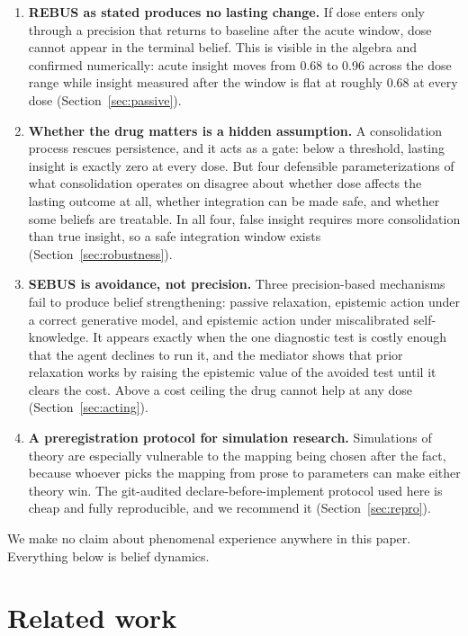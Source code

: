 \documentclass[11pt]{article}
\begin{document}
\begin{enumerate}
  \item \textbf{REBUS as stated produces no lasting change.} If dose enters only
  through a precision that returns to baseline after the acute window, dose cannot
  appear in the terminal belief. This is visible in the algebra and confirmed
  numerically: acute insight moves from 0.68 to 0.96 across the dose range while
  insight measured after the window is flat at roughly 0.68 at every dose
  (Section~\ref{sec:passive}).

  \item \textbf{Whether the drug matters is a hidden assumption.} A consolidation
  process rescues persistence, and it acts as a gate: below a threshold, lasting
  insight is exactly zero at every dose. But four defensible parameterizations of what
  consolidation operates on disagree about whether dose affects the lasting outcome at
  all, whether integration can be made safe, and whether some beliefs are treatable.
  In all four, false insight requires more consolidation than true insight, so a safe
  integration window exists (Section~\ref{sec:robustness}).

  \item \textbf{SEBUS is avoidance, not precision.} Three precision-based mechanisms
  fail to produce belief strengthening: passive relaxation, epistemic action under a
  correct generative model, and epistemic action under miscalibrated self-knowledge.
  It appears exactly when the one diagnostic test is costly enough that the agent
  declines to run it, and the mediator shows that prior relaxation works by raising
  the epistemic value of the avoided test until it clears the cost. Above a cost
  ceiling the drug cannot help at any dose (Section~\ref{sec:acting}).

  \item \textbf{A preregistration protocol for simulation research.} Simulations of
  theory are especially vulnerable to the mapping being chosen after the fact, because
  whoever picks the mapping from prose to parameters can make either theory win. The
  git-audited declare-before-implement protocol used here is cheap and fully
  reproducible, and we recommend it (Section~\ref{sec:repro}).
\end{enumerate}

We make no claim about phenomenal experience anywhere in this paper. Everything below
is belief dynamics.

\section{Related work}
\label{sec:related}
\end{document}
